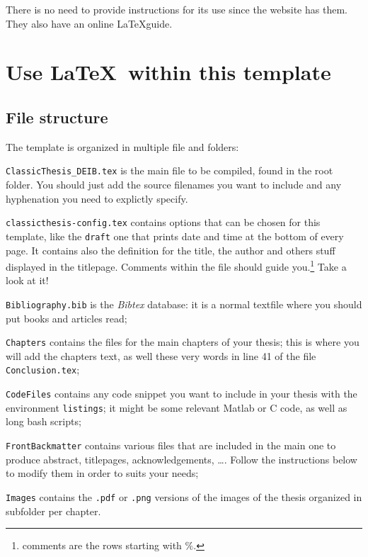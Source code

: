 There is no need to provide instructions for its use since the website has them.
They also have an online \LaTeX guide.

\section{Use \LaTeX\ within this template}

\subsection{File structure}
The template is organized in multiple file and folders:
\begin{aenumerate}

	\item \verb!ClassicThesis_DEIB.tex! is the main file to be compiled, found in the root folder.
	You should just add the source filenames you want to include and any hyphenation you need to explictly specify. 

	\item \verb!classicthesis-config.tex! contains options that can be chosen for this template, like the \verb!draft! one that prints date and time at the bottom of every page.
	It contains also the definition for the title, the author and others stuff displayed in the titlepage.
	Comments within the file should guide you.\footnote{comments are the rows starting with $\%$.} 
	Take a look at it!

	\item \verb!Bibliography.bib! is the \emph{Bibtex} database: it is a normal textfile where you should put books and articles read;

	\item \verb!Chapters! contains the files for the main chapters of your thesis; this is where you will add the chapters text, as well these very words in line 41 of the file \verb!Conclusion.tex!;

	\item \verb!CodeFiles! contains any code snippet you want to include in your thesis with the environment \verb!listings!; it might be some relevant Matlab or C code, as well as long bash scripts;

	\item \verb!FrontBackmatter! contains various files that are included in the main one to produce abstract, titlepages, acknowledgements, \ldots. 
	Follow the instructions below to modify them in order to suits your needs;

	\item \verb!Images! contains the \verb!.pdf! or \verb!.png! versions of the images of the thesis organized in subfolder per chapter.

\end{aenumerate}

